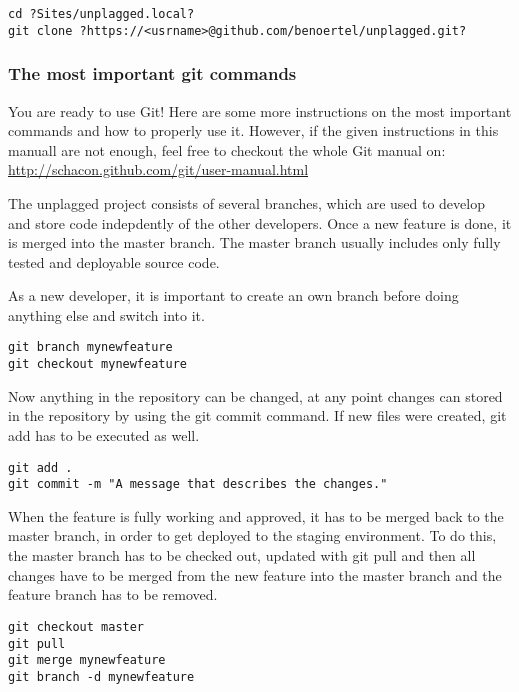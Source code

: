 \begin{lstlisting}[caption=Cloning a repository]
cd ?Sites/unplagged.local?
git clone ?https://<usrname>@github.com/benoertel/unplagged.git?
\end{lstlisting}

\subsubsection{The most important git commands}

You are ready to use Git! Here are some more instructions on the most important commands and how to properly use it. 
However, if the given instructions in this manuall are not enough, feel free to checkout the whole Git manual on: 
\url{http://schacon.github.com/git/user-manual.html}

The unplagged project consists of several branches, which are used to develop and store code indepdently of the other 
developers. Once a new feature is done, it is merged into the master branch. The master branch usually includes only 
fully tested and deployable source code. 

As a new developer, it is important to create an own branch before doing anything else and switch into it.

\begin{lstlisting}[caption=Creating branches]
git branch mynewfeature
git checkout mynewfeature
\end{lstlisting}

Now anything in the repository can be changed, at any point changes can stored in the repository by using the git commit command. If new files were created, git add has to be executed as well.

\begin{lstlisting}[caption=Creating branches]
git add .
git commit -m "A message that describes the changes."
\end{lstlisting}

When the feature is fully working and approved, it has to be merged back to the master branch, in order to get deployed 
to the staging environment. To do this, the master branch has to be checked out, updated with git pull and then all changes
have to be merged from the new feature into the master branch and the feature branch has to be removed.

\begin{lstlisting}[caption=Creating branches]
git checkout master
git pull
git merge mynewfeature
git branch -d mynewfeature
\end{lstlisting}

